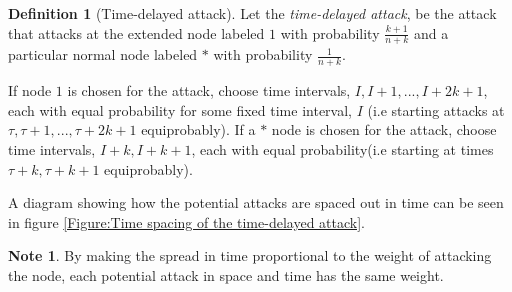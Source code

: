 \documentclass[a4paper,10pt]{article}
\theoremstyle{definition}
\newtheorem{definition}[theorem]{Definition}
\theoremstyle{definition}
\theoremstyle{remark}
\theoremstyle{definition}
\newtheorem*{note}{Note}
\begin{document}
\begin{definition}[Time-delayed attack]
Let the \textit{time-delayed attack}, be the attack that attacks at the extended node labeled $1$ with probability $\frac{k+1}{n+k}$ and a particular normal node labeled $*$ with probability $\frac{1}{n+k}$.

If node $1$ is chosen for the attack, choose time intervals, $I,I+1,...,I+2k+1$, each with equal probability for some fixed time interval, $I$ (i.e starting attacks at $\tau, \tau+1,...,\tau+2k+1$ equiprobably). If a $*$ node is chosen for the attack, choose time intervals, $I+k,I+k+1$, each with equal probability(i.e starting at times $\tau+k,\tau+k+1$ equiprobably).
\end{definition}

A diagram showing how the potential attacks are spaced out in time can be seen in figure \ref{Figure:Time spacing of the time-delayed attack}.

\begin{myfigure}
\begin{center}
\end{center}
\caption{Time spacing of the time-delayed attack, for node $1$ and $*$ nodes.}
\label{Figure:Time spacing of the time-delayed attack}
\end{myfigure}

\begin{note}
By making the spread in time proportional to the weight of attacking the node, each potential attack in space and time has the same weight.
\end{note}
\end{document}
